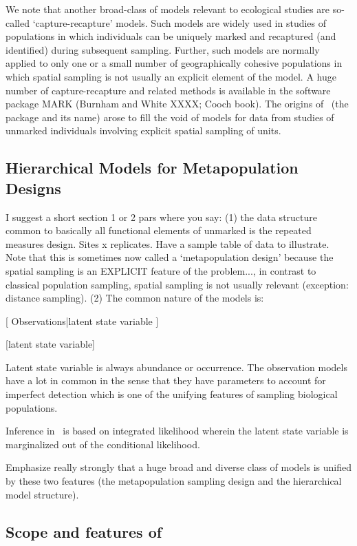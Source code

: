 \documentclass[article,shortnames]{jss}
\newcommand{\um}{\pkg{unmarked}}
\begin{document}
We note that another broad-class of models relevant to ecological studies 
are so-called `capture-recapture' models. Such models are widely used in 
studies of  populations in which individuals can be uniquely marked and 
recaptured (and identified) during subsequent sampling.  Further, such 
models are normally applied to only one or a small number of geographically 
cohesive populations in which spatial sampling is not usually an explicit 
element of the model. A huge number of capture-recapture and related 
methods is available in the software package MARK 
(Burnham and White XXXX; Cooch book). The origins of \um\ 
(the package and its name) arose 
to fill the void of models for data from studies of unmarked 
individuals involving explicit spatial sampling of units.


\subsection{Hierarchical Models for Metapopulation Designs}

I suggest a short section 1 or 2 pars where you say:
 (1) the data structure common to basically all functional elements of 
 unmarked is the repeated measures design. Sites x replicates.  
 Have a sample table of data to illustrate. 
 Note that this is sometimes now called a `metapopulation design' because 
 the spatial sampling is an EXPLICIT feature of the problem..., in contrast 
 to classical population sampling, spatial sampling is not usually 
 relevant (exception: distance sampling). 
 (2) The common nature of the models is:

[ Observations|latent state variable  ]

 [latent state variable]

Latent state variable is always abundance or occurrence. The observation 
models have a lot in common in the sense that they have parameters to 
account for imperfect detection which is one of the unifying features of 
sampling biological populations. 

Inference in \um\ is based on integrated likelihood wherein the latent state 
variable is marginalized out of the conditional likelihood.

Emphasize really strongly that a huge broad and diverse class of models is 
unified by these two features (the metapopulation sampling design and the 
hierarchical model structure).

\subsection[Scope and features of unmarked]{Scope and features of } 
\end{document}
